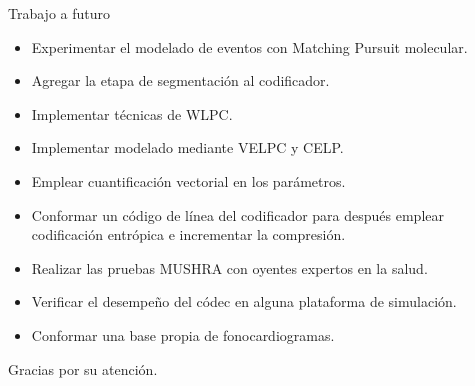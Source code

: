 \documentclass[xcolor=table]{beamer}
\begin{document}
\begin{frame}{Trabajo a futuro}
	\begin{itemize}
	\item<2-> Experimentar el modelado de eventos con Matching Pursuit molecular.
	\item<3-> Agregar la etapa de segmentaci\'on al codificador.
	\item<4-> Implementar t\'ecnicas de WLPC.
	\item<5-> Implementar modelado mediante VELPC y CELP.
	\item<6-> Emplear cuantificaci\'on vectorial en los par\'ametros.
	\item<7-> Conformar un c\'odigo de l\'inea del codificador para despu\'es emplear codificaci\'on entr\'opica e incrementar la compresi\'on.
	\item<8-> Realizar las pruebas MUSHRA con oyentes expertos en la salud.
	\item<9-> Verificar el desempe\~no del c\'odec en alguna plataforma de simulaci\'on.
	\item<10-> Conformar una base propia de fonocardiogramas.
	\end{itemize}
\end{frame}
\begin{frame}
		\huge{Gracias por su atenci\'on.} 
		
\end{frame}
\end{document}
